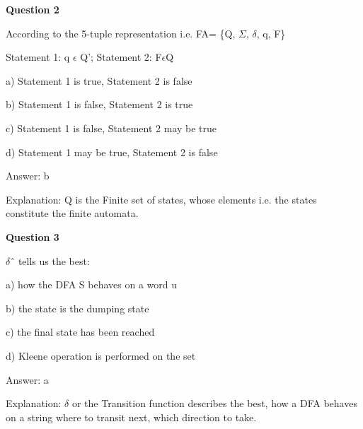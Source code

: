 \documentclass{article}
\begin{document}
\begin{mdframed}[linewidth=1pt, roundcorner=5pt, linecolor=gray!30, backgroundcolor=gray!5]
\textbf{Question 2} 

According to the 5-tuple representation i.e. FA= \{Q, $\Sigma$, $\delta$, q, F\}

Statement 1: q $\epsilon$ Q'; Statement 2: F$\epsilon$Q

a) Statement 1 is true, Statement 2 is false

b) Statement 1 is false, Statement 2 is true

c) Statement 1 is false, Statement 2 may be true

d) Statement 1 may be true, Statement 2 is false
\vspace{5pt} \par
\begin{tcolorbox}[colback=green!5, colframe=green!40!black, title=Solution]
Answer: b

Explanation: Q is the Finite set of states, whose elements i.e. the states constitute the finite automata.
\end{tcolorbox}
\end{mdframed}

\begin{mdframed}[linewidth=1pt, roundcorner=5pt, linecolor=gray!30, backgroundcolor=gray!5]
\textbf{Question 3} 

$\delta$ˆ tells us the best:

a) how the DFA S behaves on a word u

b) the state is the dumping state

c) the final state has been reached

d) Kleene operation is performed on the set
\vspace{5pt} \par
\begin{tcolorbox}[colback=green!5, colframe=green!40!black, title=Solution]
Answer: a

Explanation: $\delta$ or the Transition function describes the best, how a DFA behaves on a string where to transit next, which direction to take.
\end{tcolorbox}
\end{mdframed}
\newpage
\end{document}
